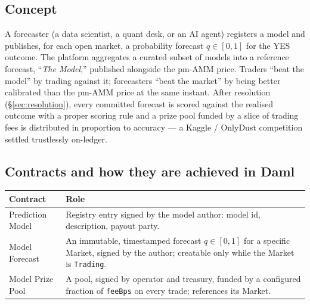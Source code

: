 \documentclass[11pt,a4paper]{article}
\begin{document}
\subsection{Concept}

A forecaster (a data scientist, a quant desk, or an AI agent) registers a model and publishes, for each open market, a probability forecast $q \in [0,1]$ for the YES outcome. The platform aggregates a curated subset of models into a reference forecast, ``\emph{The Model},'' published alongside the pm-AMM price. Traders ``beat the model'' by trading against it; forecasters ``beat the market'' by being better calibrated than the pm-AMM price at the same instant. After resolution (\S\ref{sec:resolution}), every committed forecast is scored against the realised outcome with a proper scoring rule and a prize pool funded by a slice of trading fees is distributed in proportion to accuracy --- a Kaggle / OnlyDust competition settled trustlessly on-ledger.

\subsection{Contracts and how they are achieved in Daml}

\begin{center}
\begin{tabular}{p{3.6cm} p{10.4cm}}
\toprule
\textbf{Contract} & \textbf{Role} \\
\midrule
Prediction Model & Registry entry signed by the model author: model id, description, payout party. \\
Model Forecast & An immutable, timestamped forecast $q \in [0,1]$ for a specific Market, signed by the author; creatable only while the Market is \texttt{Trading}. \\
Model Prize Pool & A pool, signed by operator and treasury, funded by a configured fraction of \texttt{feeBps} on every trade; references its Market. \\
\bottomrule
\end{tabular}
\end{center}
\end{document}

